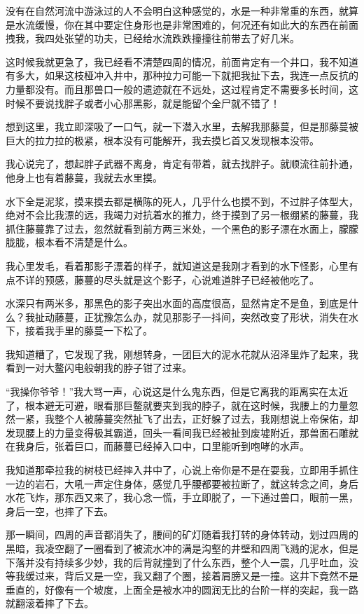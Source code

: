 没有在自然河流中游泳过的人不会明白这种感觉的，水是一种非常重的东西，就算是水流缓慢，你在其中要定住身形也是非常困难的，何况还有如此大的东西在前面拽我，我四处张望的功夫，已经给水流跌跌撞撞往前带去了好几米。

这时候我就更急了，我已经看不清楚四周的情况，前面肯定有一个井口，我不知道有多大，如果这枝桠冲入井中，那种拉力可能一下就把我扯下去，我连一点反抗的力量都没有。而且那兽口一般的遗迹就在不远处，这过程肯定不需要多长时间，这时候不要说找胖子或者小心那黑影，就是能留个全尸就不错了！

想到这里，我立即深吸了一口气，就一下潜入水里，去解我那藤蔓，但是那藤蔓被巨大的拉力拉的极紧，根本没有可能解开，我去摸匕首又发现根本没带。

我心说完了，想起胖子武器不离身，肯定有带着，就去找胖子。就顺流往前扑通，他身上也有着藤蔓，我就去水里摸。

水下全是泥浆，摸来摸去都是横陈的死人，几乎什么也摸不到，不过胖子体型大，绝对不会比我漂的远，我竭力对抗着水的推力，终于摸到了另一根绷紧的藤蔓，我抓住藤蔓靠了过去，忽然就看到前方两三米处，一个黑色的影子漂在水面上，朦朦胧胧，根本看不清楚是什么。

我心里发毛，看着那影子漂着的样子，就知道这是我刚才看到的水下怪影，心里有点不详的预感，藤蔓的尽头就是这个影子，心说难道胖子已经被他吃了。

水深只有两米多，那黑色的影子突出水面的高度很高，显然肯定不是鱼，到底是什么？我扯动藤蔓，正犹豫怎么办，就见那影子一抖间，突然改变了形状，消失在水下，接着我手里的藤蔓一下松了。

我知道糟了，它发现了我，刚想转身，一团巨大的泥水花就从沼泽里炸了起来，我看到一对大鳌闪电般朝我的脖子钳了过来。

“我操你爷爷！”我大骂一声，心说这是什么鬼东西，但是它离我的距离实在太近了，根本避无可避，眼看那巨鳌就要夹到我的脖子，就在这时候，我腰上的力量忽然一紧，我整个人被藤蔓突然扯飞了出去，正好躲了过去，我刚想说上帝保佑，却发现腰上的力量变得极其霸道，回头一看间我已经被扯到废墟附近，那兽面石雕就在我身后，张着巨口，而藤蔓已经掉入口中，口里能听到咆哮的水声。

我知道那牵拉我的树枝已经摔入井中了，心说上帝你是不是在耍我，立即用手抓住一边的岩石，大吼一声定住身体，感觉几乎腰都要被拉断了，就这转念之间，身后水花飞炸，那东西又来了，我心念一慌，手立即脱了，一下通过兽口，眼前一黑，身后一空，也摔了下去。

那一瞬间，四周的声音都消失了，腰间的矿灯随着我打转的身体转动，划过四周的黑暗，我凌空翻了一圈看到了被流水冲的满是沟壑的井壁和四周飞溅的泥水，但是下落并没有持续多少妙，我的后背就撞到了什么东西，整个人一震，几乎吐血，没等我缓过来，背后又是一空，我又翻了个圈，接着肩膀又是一撞。这井下竟然不是垂直的，好像有一个坡度，上面全是被水冲的圆润无比的台阶一样的突起，我一路就翻滚着摔了下去。

